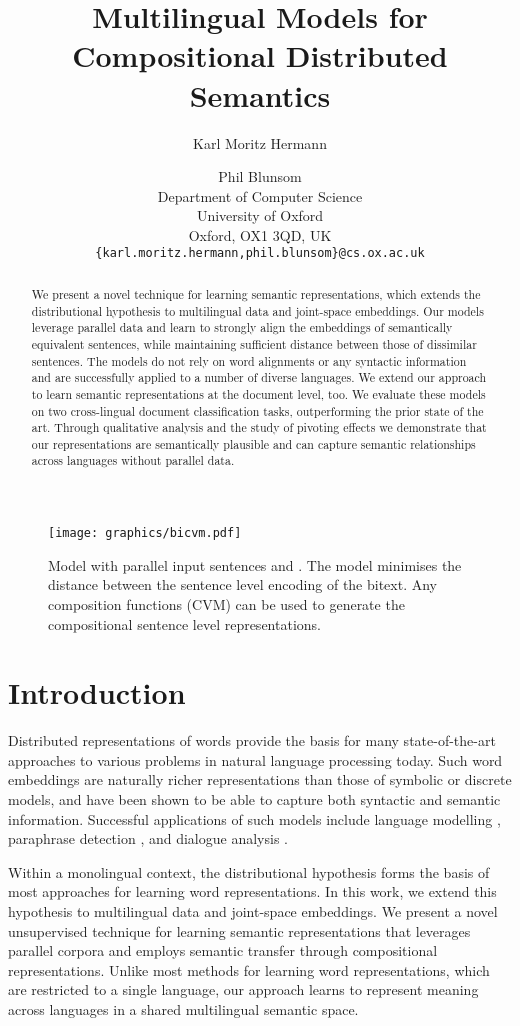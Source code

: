 \documentclass[11pt]{article}
\title{Multilingual Models for Compositional Distributed Semantics}
\author{Karl Moritz Hermann \and Phil Blunsom\\
 Department of Computer Science\\
 University of Oxford\\
 Oxford, OX1 3QD, UK\\
 {\tt \{karl.moritz.hermann,phil.blunsom\}@cs.ox.ac.uk}}
\date{}
\newcommand{\CVM}{\textsc{CVM}\xspace}
\begin{document}
\maketitle
\begin{abstract}
We present a novel technique for learning semantic representations, which
extends the distributional hypothesis to multilingual data and joint-space
embeddings. Our models leverage parallel data and learn to strongly align the
embeddings of semantically equivalent sentences, while maintaining sufficient
distance between those of dissimilar sentences. The models do not rely on
word alignments or any syntactic information and are successfully applied to a
number of diverse languages. We extend our approach to learn semantic
representations at the document level, too. We evaluate these models on two cross-lingual
document classification tasks, outperforming the prior state of the art.
Through qualitative analysis and the study of pivoting effects we demonstrate
that our representations are semantically plausible and can capture semantic
relationships across languages without parallel data.
\end{abstract}

\begin{figure}[t]
  \centering
  \captionsetup{font=small}
  \texttt{[image: graphics/bicvm.pdf]}
  \caption{Model with parallel input sentences  and . The model
    minimises the distance between the sentence level encoding of the bitext.
    Any composition functions (\CVM) can be used to generate the
    compositional sentence level representations.
    }\label{fig:bilingual}
  \vspace{-1em}
\end{figure}
\section{Introduction}

Distributed representations of words provide the basis for many state-of-the-art
approaches to various problems in natural language processing today. Such word
embeddings are naturally richer representations than those of symbolic or
discrete models, and have been shown to be able to capture both syntactic and
semantic information. Successful applications of such models include language
modelling \cite{Bengio:2003}, paraphrase detection \cite{Erk:2008}, and dialogue
analysis \cite{Kalchbrenner:2013}.

Within a monolingual context, the distributional hypothesis \cite{Firth:1957}
forms the basis of most approaches for learning word representations. In this
work, we extend this hypothesis to multilingual data and joint-space embeddings.
We present a novel unsupervised technique for learning semantic
representations that leverages parallel corpora and employs semantic transfer
through compositional representations. Unlike most methods for learning word
representations, which are restricted to a single language, our approach learns to
represent meaning across languages in a shared multilingual semantic space.
\end{document}
